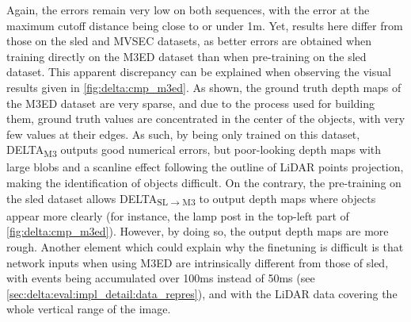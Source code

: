 \begin{table}[ht]
  \centering
  \caption{Absolute depth errors (in meters) on the M3ED dataset for various cutoff depth distances (for the ``before'' depth maps \(D_\text{bf}\)).}\label{tab:delta:results_m3ed}
\end{table}

Again, the errors remain very low on both sequences, with the error at the maximum cutoff distance being close to or under 1m. Yet, results here differ from those on the \acrshort{sled} and MVSEC datasets, as better errors are obtained when training directly on the M3ED dataset than when pre-training on the \acrshort{sled} dataset. This apparent discrepancy can be explained when observing the visual results given in \cref{fig:delta:cmp_m3ed}. As shown, the ground truth depth maps of the M3ED dataset are very sparse, and due to the process used for building them, ground truth values are concentrated in the center of the objects, with very few values at their edges. As such, by being only trained on this dataset, DELTA\textsubscript{M3} outputs good numerical errors, but poor-looking depth maps with large blobs and a scanline effect following the outline of LiDAR points projection, making the identification of objects difficult. On the contrary, the pre-training on the \acrshort{sled} dataset allows DELTA\textsubscript{SL\(\rightarrow\)M3} to output depth maps where objects appear more clearly (for instance, the lamp post in the top-left part of \cref{fig:delta:cmp_m3ed}). However, by doing so, the output depth maps are more rough. Another element which could explain why the finetuning is difficult is that network inputs when using M3ED are intrinsically different from those of \acrshort{sled}, with events being accumulated over 100ms instead of 50ms (see \cref{sec:delta:eval:impl_detail:data_repres}), and with the LiDAR data covering the whole vertical range of the image.

